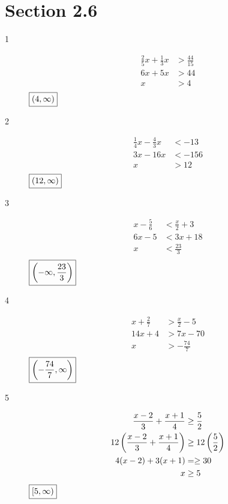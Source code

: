 \documentclass[letterpaper, landscape]{exam}
\begin{document}
  \ifprintanswers{}

    \newpage

    \section{Section 2.6} 

    \begin{description}

      \item[1] 
        \begin{align*}
          \frac{2}{5} x + \frac{1}{3} x & > \frac{44}{15} \\
          6x + 5x                       & > 44 \\
          x                             & > 4 \\
        \end{align*}
        $\boxed{ \intoo{ 4, \infty } }$

      \item[2] 
        \begin{align*}
          \frac{1}{4} x - \frac{4}{3} x & < -13 \\
          3 x - 16 x                    & < -156 \\
          x                             & > 12 \\
        \end{align*}
        $\boxed{ \intoo{ 12, \infty } }$

      \item[3] 
        \begin{align*}
          x - \frac{5}{6} & < \frac{x}{2} + 3 \\
          6x - 5          & < 3x + 18 \\
          x               & < \frac{23}{3} \\
        \end{align*}
        $\boxed{ \intoo{ -\infty, \frac{23}{3} } }$

      \item[4] 
        \begin{align*}
          x + \frac{2}{7} & > \frac{x}{2} - 5 \\
          14x + 4         & > 7x - 70 \\
          x               & > - \frac{74}{7} \\
        \end{align*}
        $\boxed{ \intoo{ - \frac{74}{7}, \infty } }$

      \item[5]
        \begin{align*}
          \frac{x-2}{3} + \frac{x+1}{4}          & \geq \frac{5}{2} \\
          12 \del{\frac{x-2}{3} + \frac{x+1}{4}} & \geq 12 \del{\frac{5}{2}} \\
          4 (x - 2) + 3(x + 1)                   & = \geq 30 \\
          x                                      & \geq 5 \\
        \end{align*}
        $\boxed{ \intco{ 5, \infty } }$


\end{description}
\end{document}
